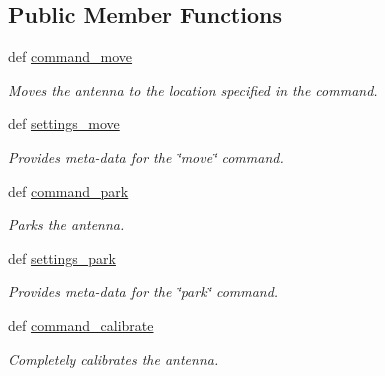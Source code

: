 \subsection*{Public Member Functions}
\begin{DoxyCompactItemize}
\item 
def \hyperlink{classhwm_1_1hardware_1_1devices_1_1drivers_1_1mxl__antenna__controller_1_1mxl__antenna__controll042461b90848f732dc4817f26065c532_a73299fdf30dfdd82d131632c343f0f01}{command\-\_\-move}
\begin{DoxyCompactList}\small\item\em Moves the antenna to the location specified in the command. \end{DoxyCompactList}\item 
def \hyperlink{classhwm_1_1hardware_1_1devices_1_1drivers_1_1mxl__antenna__controller_1_1mxl__antenna__controll042461b90848f732dc4817f26065c532_aeb0e3312f64d9c8bf6d2ca74dfefba10}{settings\-\_\-move}
\begin{DoxyCompactList}\small\item\em Provides meta-\/data for the \char`\"{}move\char`\"{} command. \end{DoxyCompactList}\item 
def \hyperlink{classhwm_1_1hardware_1_1devices_1_1drivers_1_1mxl__antenna__controller_1_1mxl__antenna__controll042461b90848f732dc4817f26065c532_abb90353cd23465087b9fe568b9f5adb0}{command\-\_\-park}
\begin{DoxyCompactList}\small\item\em Parks the antenna. \end{DoxyCompactList}\item 
def \hyperlink{classhwm_1_1hardware_1_1devices_1_1drivers_1_1mxl__antenna__controller_1_1mxl__antenna__controll042461b90848f732dc4817f26065c532_acf5564f04c4a50b2a50da5f81ffe2b11}{settings\-\_\-park}
\begin{DoxyCompactList}\small\item\em Provides meta-\/data for the \char`\"{}park\char`\"{} command. \end{DoxyCompactList}\item 
def \hyperlink{classhwm_1_1hardware_1_1devices_1_1drivers_1_1mxl__antenna__controller_1_1mxl__antenna__controll042461b90848f732dc4817f26065c532_a40c531c087cbe5907e69804e1a1273bf}{command\-\_\-calibrate}
\begin{DoxyCompactList}\small\item\em Completely calibrates the antenna. \end{DoxyCompactList}\item 

\end{DoxyCompactItemize}
